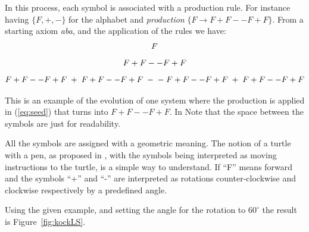 In this process, each symbol is associated with a production rule. For instance having $\{F, +, -\}$ for the alphabet and \emph{production} $\{F \rightarrow
 F+F--F+F\}$. From a starting axiom \emph{aba}, and the application of the rules we have:\\
\begin{equation} \label{eq:seed}
F\\
\end{equation}
\begin{equation} \label{eq:step1}
F+F--F+F\\
\end{equation}
\begin{equation} \label{eq:step2}
F+F--F+F \; + \; F+F--F+F \;- \;- \;F+F--F+F \;+ \;F+F--F+F\\
\end{equation}


This is an example of the evolution of one system where the production is applied  in (\ref{eq:seed}) that turns into $F+F--F+F$. In Note that the space between the symbols are just for readability.

All the symbols are assigned with a geometric meaning. The notion of a turtle with a pen, as proposed in \cite{abelson1982aa}, with the symbols being interpreted as moving instructions to the turtle, is a simple way to understand. If ``F'' means forward and the symbols ``+'' and ``-'' are interpreted as rotations counter-clockwise and clockwise respectively by a predefined angle. 

Using the given example, and setting the angle for the rotation to $60^{\circ}$ the result is Figure~\ref{fig:kockLS}.

